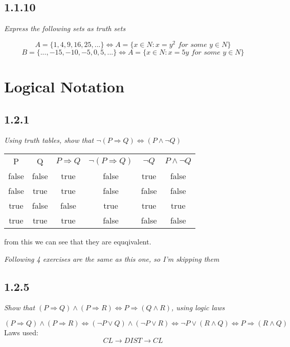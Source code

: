\documentclass[11pt,oneside,titlepage]{book}
\DeclareMathOperator \lra {\Leftrightarrow}
\DeclareMathOperator \eqv {\Leftrightarrow}
\DeclareMathOperator \ra {\Rightarrow}
\DeclareMathOperator \imp {\Rightarrow}
\begin{document}
\subsection*{1.1.10}

\textit{Express the following sets as truth sets}

$$A = \{1, 4, 9, 16, 25, ...\} \iff A = \{x \in N: x = y^2 \textit{ for some } y \in N\}$$
$$B = \{..., -15, -10, -5, 0, 5, ... \} \iff A = \{x \in N: x = 5y  \textit{ for some } y \in N\}$$

\section{Logical Notation}

\subsection*{1.2.1}

\textit{Using truth tables, show that $\neg(P \ra Q) \lra (P \land \neg Q)$}

\begin{center}
  \begin{tabular}{c| c| c| c| c| c|}
    P & Q & $P \ra Q$ & $\neg(P \ra Q)$ & $\neg Q$ & $P \land \neg Q$ \\
    false & false & true & false & true & false \\
    false & true & true & false & false & false \\
    true & false & false & true & true & true \\
    true & true & true & false & false & false \\
  \end{tabular}  
\end{center}

from this we can see that they are equqivalent.

\textit{Following 4 exercises are the same as this one, so I'm skipping them}

\subsection*{1.2.5}

\textit{Show that $(P \imp Q) \land (P \imp R) \eqv P \imp (Q \land R)$, using logic laws}

$$(P \imp Q) \land (P \imp R) \eqv (\neg P \lor Q) \land (\neg P \lor R) \eqv
\neg P  \lor (R \land Q) \eqv  P  \imp (R \land Q) $$
Laws used: 
$$CL \to DIST \to CL$$
\end{document}
